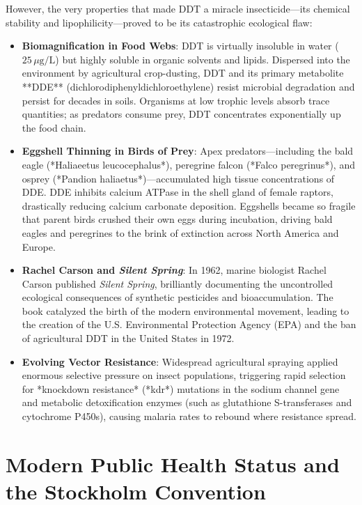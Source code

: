 However, the very properties that made DDT a miracle insecticide—its chemical stability and lipophilicity—proved to be its catastrophic ecological flaw:
\begin{itemize}
    \item \textbf{Biomagnification in Food Webs}: DDT is virtually insoluble in water ($25\,\mu\text{g/L}$) but highly soluble in organic solvents and lipids. Dispersed into the environment by agricultural crop-dusting, DDT and its primary metabolite **DDE** (dichlorodiphenyldichloroethylene) resist microbial degradation and persist for decades in soils. Organisms at low trophic levels absorb trace quantities; as predators consume prey, DDT concentrates exponentially up the food chain.
    \item \textbf{Eggshell Thinning in Birds of Prey}: Apex predators—including the bald eagle (*Haliaeetus leucocephalus*), peregrine falcon (*Falco peregrinus*), and osprey (*Pandion haliaetus*)—accumulated high tissue concentrations of DDE. DDE inhibits calcium ATPase in the shell gland of female raptors, drastically reducing calcium carbonate deposition. Eggshells became so fragile that parent birds crushed their own eggs during incubation, driving bald eagles and peregrines to the brink of extinction across North America and Europe.
    \item \textbf{Rachel Carson and \emph{Silent Spring}}: In 1962, marine biologist Rachel Carson published \emph{Silent Spring}, brilliantly documenting the uncontrolled ecological consequences of synthetic pesticides and bioaccumulation. The book catalyzed the birth of the modern environmental movement, leading to the creation of the U.S. Environmental Protection Agency (EPA) and the ban of agricultural DDT in the United States in 1972.
    \item \textbf{Evolving Vector Resistance}: Widespread agricultural spraying applied enormous selective pressure on insect populations, triggering rapid selection for *knockdown resistance* (*kdr*) mutations in the sodium channel gene and metabolic detoxification enzymes (such as glutathione S-transferases and cytochrome P450s), causing malaria rates to rebound where resistance spread.
\end{itemize}

\section{Modern Public Health Status and the Stockholm Convention}

